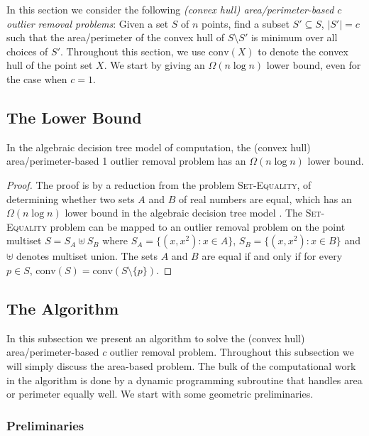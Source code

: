 \documentclass{elsart}
\newcommand{\ch}{\mathrm{conv}}
\begin{document}
In this section we consider the following \emph{(convex hull)
area/perimeter-based $c$ outlier removal problems}:  Given a set $S$
of $n$ points, find a subset $S'\subseteq S$, $|S'|=c$ such that the
area/perimeter of the convex hull of $S\setminus S'$ is minimum over
all choices of $S'$.  Throughout this section, we use $\ch(X)$ to
denote the convex hull of the point set $X$. We start by giving an
$\Omega(n\log n)$ lower bound, even for the case when $c=1$.


\subsection{The Lower Bound}


\begin{thm}
In the algebraic decision tree model of computation, the (convex hull)
area/perimeter-based 1 outlier removal problem has an 
$\Omega(n\log n)$ lower bound.
\end{thm}

\begin{proof}
The proof is by a reduction from the problem \textsc{Set-Equality}, of
determining whether two sets $A$ and $B$ of real numbers are equal,
which has an $\Omega(n\log n)$ lower bound in the algebraic decision
tree model \cite{bo84}.  The \textsc{Set-Equality} problem can be
mapped to an outlier removal problem on the point multiset $S=S_A
\uplus S_B$ where $S_A=\{(x,x^2): x\in A\}$, $S_B=\{(x,x^2):x\in B\}$
and $\uplus$ denotes multiset union. The sets $A$ and $B$ are equal if
and only if for every $p\in S$, $\ch(S)=\ch(S\setminus\{p\})$. 
\end{proof}

\subsection{The Algorithm}

In this subsection we present an algorithm to solve the (convex hull)
area/perimeter-based $c$ outlier removal problem.  Throughout this
subsection we will simply discuss the area-based problem.  The bulk of
the computational work in the algorithm is done by a dynamic
programming subroutine that handles area or perimeter equally well.
We start with some geometric preliminaries.

\subsubsection{Preliminaries} 
\end{document}
